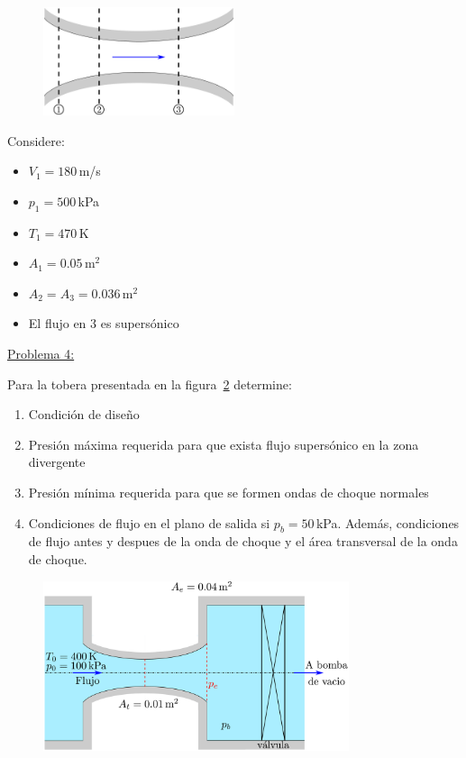 \documentclass[11pt]{report}
\begin{document}
\begin{figure}[H]
\centering\includegraphics[width=0.5\textwidth]{Figures/conv_div.eps}
\caption{\label{fig:fig2} }
\end{figure}
Considere:
\begin{itemize}
\item $V_1=180$\,m/s
\item $p_1=500$\,kPa
\item $T_1=470$\,K
\item $A_1=0.05$\,m$^2$
\item $A_2=A_3=0.036$\,m$^2$
\item El flujo en $3$ es supers\'onico
\end{itemize}
\vspace{0.2cm}

\newpage
\underline {Problema 4:}
\vspace{0.2cm}

Para la tobera presentada en la figura~\ref{fig:fig3} determine:
\begin{enumerate}
\item Condici\'on de diseño
\item Presi\'on m\'axima requerida para que exista flujo supers\'onico en la zona divergente
\item Presi\'on m\'inima requerida para que se formen ondas de choque normales
\item Condiciones de flujo en el plano de salida si $p_b=50$\,kPa. Adem\'as, condiciones de flujo antes y despues de la onda de choque y el \'area transversal de la onda de choque.
\end{enumerate}

\begin{figure}[H]
\centering\includegraphics[width=0.8\textwidth]{Figures/tobera_convdiv.eps}
\caption{\label{fig:fig3} }
\end{figure}

\end{document}
